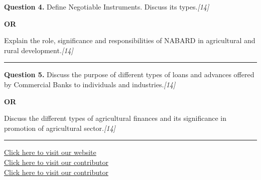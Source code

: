 \documentclass[11pt,a4paper]{article}
\newcommand{\pts}[1]{\hfill   \textit{[#1]}}
\begin{document}
\noindent   \textbf{Question 4.}
Define Negotiable Instruments. Discuss its types.\pts{14}

\centerline{   \textbf{OR}}

Explain the role, significance and responsibilities of NABARD in agricultural and rural development.\pts{14}

\medskip\rule{\linewidth}{0.2pt}




\noindent   \textbf{Question 5.}
Discuss the purpose of different types of loans and advances offered by Commercial Banks to individuals and industries.\pts{14}

\centerline{   \textbf{OR}}

Discuss the different types of agricultural finances and its significance in promotion of agricultural sector.\pts{14}

\vfill
\rule{\linewidth}{0.4pt}

\begin{center}\small
\href{https://bhu-exam.vercel.app/}{Click here to visit our website}\\[4pt]
\href{https://me-aryan.vercel.app/}{Click here to visit our contributor}\\[4pt]
\href{https://quashan-me.vercel.app/}{Click here to visit our contributor}
\end{center}
\end{document}

